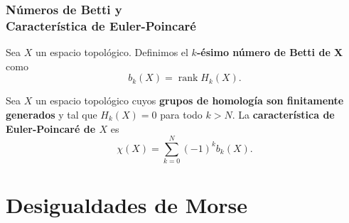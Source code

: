 \documentclass[11pt]{beamer}
\begin{document}
	
\begin{frame}
\frametitle{Números de Betti y \\ Característica de Euler-Poincaré}
	\begin{definition}
		Sea $X$ un espacio topológico. Definimos el \textbf{$k$-ésimo número de Betti de X} como 
		\begin{equation*}
			b_k(X) = \operatorname{rank} H_k(X).
		\end{equation*}
	\end{definition}

	\begin{definition}
		Sea $X$ un espacio topológico cuyos \textbf{grupos de homología son finitamente generados} y tal que $H_k(X)=0$ para todo $k>N$. La \textbf{característica de Euler-Poincaré de $X$} es 
		\begin{equation*}
			\chi (X) = \sum^N_{k=0} (-1)^k b_k(X).
		\end{equation*}
\end{definition}


\end{frame}

\section{Desigualdades de Morse}
\end{document}
